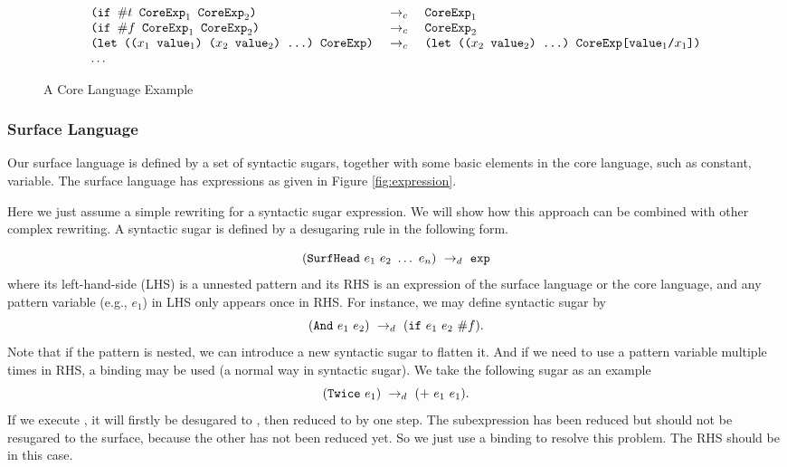 \begin{figure*}[thb]
\begin{centering}
{\[{\begin{array}{lcl}
		\texttt{(if~$\#t$~$\mbox{\tt CoreExp}_1$~$\mbox{\tt CoreExp}_2$)}&~\rightarrow_c~& \texttt{$\mbox{\tt CoreExp}_1$}\\
		\texttt{(if~$\#f$~$\mbox{\tt CoreExp}_1$~$\mbox{\tt CoreExp}_2$)}&~\rightarrow_c~& \texttt{$\mbox{\tt CoreExp}_2$}\\
		\texttt{(let~(($x_1$~$\mbox{\tt value}_1$)~($x_2$~$\mbox{\tt value}_2$)~...)~CoreExp)}&~\rightarrow_c~&\texttt{(let~(($x_2$~$\mbox{\tt value}_2$)~...)~CoreExp[$\mbox{\tt value}_1$/$x_1$])}\\
		\ldots&&
		\end{array}
}
\]
}



\end{centering}
\caption{A Core Language Example}
\label{fig:core}
\end{figure*}




\subsubsection{Surface Language}

Our surface language is defined by a set of syntactic sugars, together with some basic elements in the core language, such as constant, variable. The surface language has expressions as given in Figure \ref{fig:expression}.

Here we just assume a simple rewriting for a syntactic sugar expression. We will show how this approach can be combined with other complex rewriting. A syntactic sugar is defined by a desugaring rule in the following form.

\[
(\mbox{\tt SurfHead}~e_1~e_2~\ldots~e_n) ~\rightarrow_d~ \mbox{\tt exp}
\]
where its left-hand-side (LHS) is a unnested pattern and its RHS is an expression of the surface language or the core language, and any pattern variable (e.g., $e_1$) in LHS only appears once in RHS. For instance, we may define syntactic sugar  by
\[
(\mbox{\tt And}~e_1~e_2) ~\rightarrow_d~ (\mbox{\tt if}~e_1~e_2~\#f).
\]
Note that if the pattern is nested, we can introduce a new syntactic sugar to flatten it. And if we need to use a pattern variable multiple times in RHS, a  binding may be used (a normal way in syntactic sugar). We take the following sugar as an example
\[
(\mbox{\tt Twice}~e_1) ~\rightarrow_d~ (+~e_1~e_1).
\]
If we execute , it will firstly be desugared to , then reduced to  by one step. The subexpression  has been reduced but should not be resugared to the surface, because the other  has not been reduced yet.
So we just use a  binding to resolve this problem. The RHS should be  in this case.


